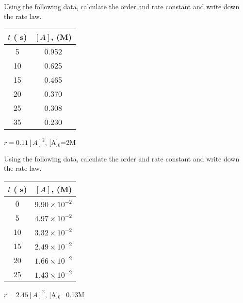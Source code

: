 \documentclass[main.tex]{subfiles}
\begin{document}
\begin{multicols*}{2}
\begin{question}[ID=\the\value{numA}]
Using the following data, calculate the order and rate constant and write down the rate law.
\begin{center}\begin{tabular}[t]{   c  c   }
\toprule
  $t$ ( s)	&$[A]$, (M) \\
\midrule
5&	0.952\\
10&	0.625\\
15&	0.465\\
20&	0.370\\
25&	0.308\\
35&	0.230\\
\bottomrule
\end{tabular}\end{center}
\end{question}
\begin{solution}
 $r=0.11[A]^2$, [A]$_0$=2M
\hspace{0.1cm}\end{solution}%

\begin{question}[ID=\the\value{numA}]
Using the following data, calculate the order and rate constant and write down the rate law.
\begin{center}\begin{tabular}[t]{   c  c   }
\toprule
  $t$ ( s)	&$[A]$, (M) \\
\midrule
0&	$9.90\times10^{-2}$\\
5&	$4.97\times10^{-2}$\\
10&	$3.32\times10^{-2}$\\
15&	$2.49\times10^{-2}$\\
20&	$1.66\times10^{-2}$\\
25&	$1.43\times10^{-2}$\\
\bottomrule
\end{tabular}\end{center}
\end{question}
\begin{solution}
 $r=2.45[A]^2$, [A]$_0$=0.13M
\hspace{0.1cm}\end{solution}%





\end{multicols*}
\end{document}
